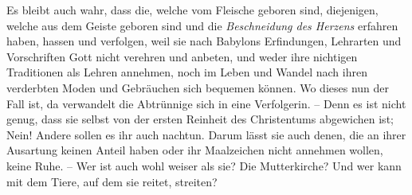 Es bleibt auch wahr, dass die, welche vom Fleische geboren sind,
diejenigen, welche aus dem Geiste geboren sind und die \textit{Beschneidung des
Herzens}  erfahren haben,
hassen und verfolgen, weil sie nach
Babylons Erfindungen, Lehrarten und Vorschriften Gott nicht verehren und
anbeten, und weder ihre nichtigen Traditionen als Lehren annehmen, noch im Leben
und Wandel nach ihren verderbten Moden und Gebräuchen sich bequemen können.
Wo dieses nun der Fall ist, da verwandelt die Abtrünnige sich in eine
Verfolgerin.
-- Denn es ist nicht genug, dass sie selbst von der ersten Reinheit des
Christentums abgewichen ist;
Nein!
Andere sollen es ihr auch nachtun.
Darum lässt sie auch denen, die an ihrer Ausartung keinen Anteil haben oder ihr
Maalzeichen
nicht annehmen wollen, keine Ruhe.
-- Wer ist auch wohl weiser als sie? Die Mutterkirche?
Und wer kann mit dem Tiere, auf dem sie reitet, streiten?

\medskip

